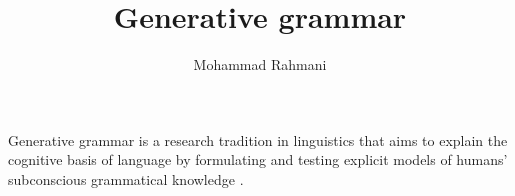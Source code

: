 \documentclass[a4paper]{article}
\title{Generative grammar}
\date{}
\author{Mohammad Rahmani}
\begin{document}
\maketitle
    Generative grammar is a research tradition in linguistics that aims to explain the cognitive basis of language by formulating and testing explicit models of humans' subconscious grammatical knowledge .
    
    
\end{document}
